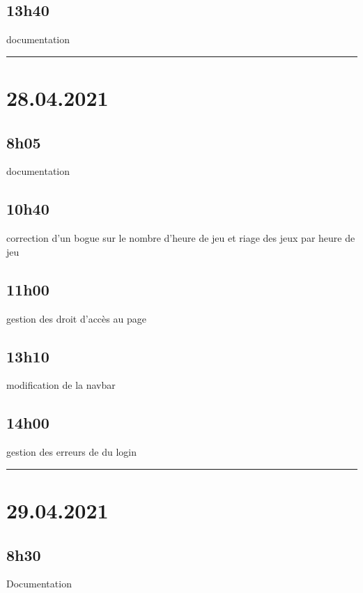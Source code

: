 \documentclass[a4paper,12pt,french]{sphinxmanual}
\begin{document}
\subsection{13h40}
\label{\detokenize{logbook:id41}}
\sphinxAtStartPar
documentation


\bigskip\hrule\bigskip



\section{28.04.2021}
\label{\detokenize{logbook:id42}}

\subsection{8h05}
\label{\detokenize{logbook:id43}}
\sphinxAtStartPar
documentation


\subsection{10h40}
\label{\detokenize{logbook:id44}}
\sphinxAtStartPar
correction d’un bogue sur le nombre d’heure de jeu et riage des jeux par heure de jeu


\subsection{11h00}
\label{\detokenize{logbook:id45}}
\sphinxAtStartPar
gestion des droit d’accès au page


\subsection{13h10}
\label{\detokenize{logbook:id46}}
\sphinxAtStartPar
modification de la navbar


\subsection{14h00}
\label{\detokenize{logbook:id47}}
\sphinxAtStartPar
gestion des erreurs de du login


\bigskip\hrule\bigskip



\section{29.04.2021}
\label{\detokenize{logbook:id48}}

\subsection{8h30}
\label{\detokenize{logbook:id49}}
\sphinxAtStartPar
Documentation
\end{document}
